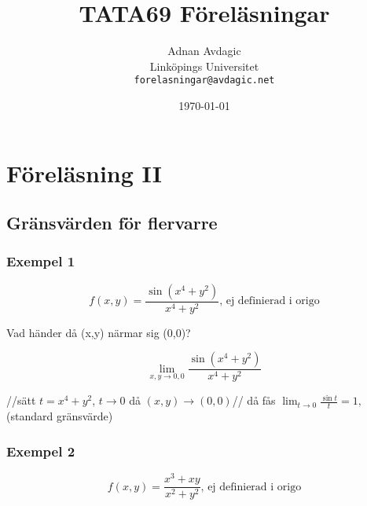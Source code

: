 \documentclass[a4paper]{article}
\title{TATA69 Föreläsningar}
\author{Adnan Avdagic\\
	Linköpings Universitet\\
	\texttt{forelasningar@avdagic.net}}
\date{\today}
\begin{document}
\hypersetup{pageanchor=false}
\begin{titlepage}
\maketitle
{}
\thispagestyle{empty}
\end{titlepage}


\cleardoublepage
{}
\tableofcontents
\cleardoublepage
{}




\newpage
\hypersetup{pageanchor=true}
\cleardoublepage
\setcounter{page}{1}
\setcounter{section}{1}
\pagestyle{fancy}
\fancyhf{}
\rfoot{\rightmark}
\noindent
\section{Föreläsning II}
\subsection{Gränsvärden för flervarre}

\subsubsection{Exempel 1} \flushleft
\begin{equation} \label{eq:2.1}
	f(x,y) = \frac{\sin(x^4+y^2)}{x^4+y^2} \text{, ej definierad i origo}
\end{equation}

Vad händer då (x,y) närmar sig (0,0)?

$$\lim_{x,y \rightarrow 0,0} \frac{\sin(x^4+y^2)}{x^4+y^2}$$

//sätt $t= \displaystyle x^4+y^2$, ${t \rightarrow 0}$ då ${(x,y) \rightarrow (0,0)}$// \newline
då fås \(\displaystyle \lim_{t \rightarrow 0} \frac{\sin t}{t} = 1,\) (standard gränsvärde) \newline

\subsubsection{Exempel 2} \flushleft
\begin{equation} \label{eq:2.2}
	f(x,y) = \frac{x^3+xy}{x^2+y^2} \text{, ej definierad i origo}
\end{equation}
\end{document}
